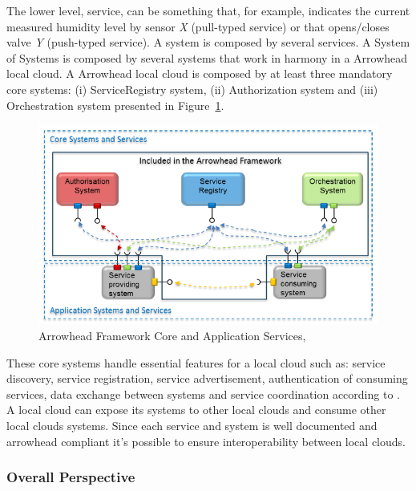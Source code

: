 The lower level, service, can be something that, for example, indicates the current measured humidity level by sensor \textit{X} (pull-typed service) or that opens/closes valve \textit{Y} (push-typed service). A system is composed by several services. A System of Systems is composed by several systems that work in harmony in a Arrowhead local cloud. A Arrowhead local cloud is composed by at least three mandatory core systems: (i) ServiceRegistry system, (ii) Authorization system and (iii) Orchestration system presented in Figure~\ref{fig:stateofart:arch:arrowhead:system}.

\begin{figure}[H]
    \centering
    \includegraphics[scale=0.6]{
        assets/figures/arrowhead.png
    }
    \caption[Arrowhead Framework Core and Application Services]{Arrowhead Framework Core and Application Services, \cite{blomstedt2014arrowhead}}
    \label{fig:stateofart:arch:arrowhead:system}
\end{figure}

These core systems handle essential features for a local cloud such as: service discovery, service registration, service advertisement, authentication of consuming services, data exchange between systems and service coordination according to \cite{marcu2020arrowhead}. A local cloud can expose its systems to other local clouds and consume other local clouds systems. Since each service and system is well documented and arrowhead compliant it's possible to ensure interoperability between local clouds.

\subsubsection{Overall Perspective}
\label{subsec:stateofart:arch:prepective}

